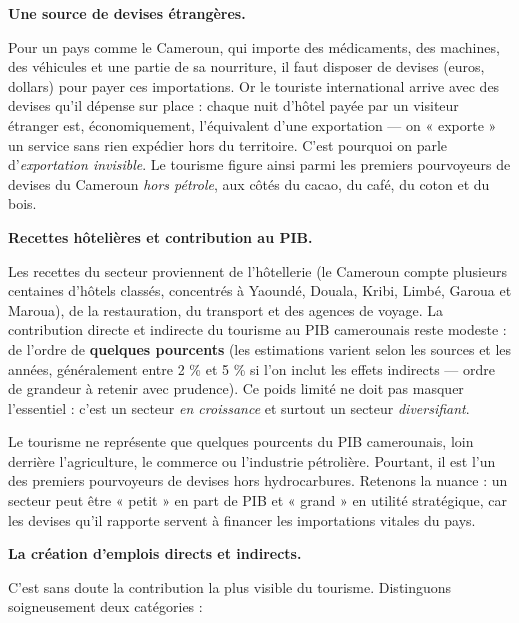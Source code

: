 \documentclass[11pt]{article}
\newcommand{\cle}[1]{{\popxbold\color{popdark}#1}}
\newcounter{popsec}
\newcounter{popsub}
\newcommand{\courssub}[1]{%
  \stepcounter{popsub}%
  \par\vspace{9pt}\noindent{\popxbold\fontsize{11.5}{13}\selectfont\color{popink}{\color{poporange}\thepopsec.\thepopsub}\hspace{6pt}#1}\par\nopagebreak\vspace{4pt}
}
\begin{document}
\courssub{L'importance économique du tourisme}

\textbf{Une source de devises étrangères.}\par
Pour un pays comme le Cameroun, qui importe des médicaments, des machines, des véhicules et une partie de sa nourriture, il faut disposer de \cle{devises} (euros, dollars) pour payer ces importations. Or le touriste international arrive avec des devises qu'il dépense sur place : chaque nuit d'hôtel payée par un visiteur étranger est, économiquement, l'équivalent d'une exportation — on « exporte » un service sans rien expédier hors du territoire. C'est pourquoi on parle d'\emph{exportation invisible}. Le tourisme figure ainsi parmi les premiers pourvoyeurs de devises du Cameroun \emph{hors pétrole}, aux côtés du cacao, du café, du coton et du bois.

\textbf{Recettes hôtelières et contribution au PIB.}\par
Les recettes du secteur proviennent de l'hôtellerie (le Cameroun compte plusieurs centaines d'hôtels classés, concentrés à Yaoundé, Douala, Kribi, Limbé, Garoua et Maroua), de la restauration, du transport et des agences de voyage. La contribution directe et indirecte du tourisme au \cle{PIB} camerounais reste modeste : de l'ordre de \textbf{quelques pourcents} (les estimations varient selon les sources et les années, généralement entre 2 \% et 5 \% si l'on inclut les effets indirects — ordre de grandeur à retenir avec prudence). Ce poids limité ne doit pas masquer l'essentiel : c'est un secteur \emph{en croissance} et surtout un secteur \emph{diversifiant}.

\begin{exemplebox}
Le tourisme ne représente que quelques pourcents du PIB camerounais, loin derrière l'agriculture, le commerce ou l'industrie pétrolière. Pourtant, il est l'un des premiers pourvoyeurs de \cle{devises} hors hydrocarbures. Retenons la nuance : un secteur peut être « petit » en part de PIB et « grand » en utilité stratégique, car les devises qu'il rapporte servent à financer les importations vitales du pays.
\end{exemplebox}

\textbf{La création d'emplois directs et indirects.}\par
C'est sans doute la contribution la plus visible du tourisme. Distinguons soigneusement deux catégories :
\end{document}
